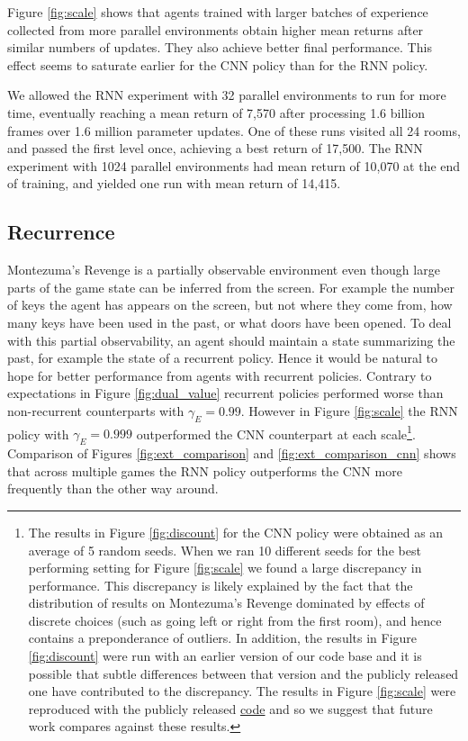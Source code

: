 \documentclass{article} \usepackage[dvipsnames]{xcolor}
\begin{document}
Figure \ref{fig:scale} shows that agents trained with larger batches of experience collected from more parallel environments obtain higher mean returns after similar numbers of updates.  They also achieve better final performance. This effect seems to saturate earlier for the CNN policy than for the RNN policy.

We allowed the RNN experiment with 32 parallel environments to run for more time, eventually reaching a mean return of 7,570 after processing 1.6 billion frames over 1.6 million parameter updates. One of these runs visited all 24 rooms, and passed the first level once, achieving a best return of 17,500. The RNN experiment with 1024 parallel environments had mean return of 10,070 at the end of training, and yielded one run with mean return of 14,415.

\subsection{Recurrence}
\label{sec:cnnrnn}
Montezuma's Revenge is a partially observable environment even though large parts of the game state can be inferred from the screen. For example the number of keys the agent has appears on the screen, but not where they come from, how many keys have been used in the past, or what doors have been opened. To deal with this partial observability, an agent should maintain a state summarizing the past, for example the state of a recurrent policy. Hence it would be natural to hope for better performance from agents with recurrent policies. Contrary to expectations in Figure \ref{fig:dual_value} recurrent policies performed worse than non-recurrent counterparts with $\gamma_E=0.99$. However in Figure \ref{fig:scale} the RNN policy with $\gamma_E=0.999$ outperformed the CNN counterpart at each scale\footnote{The results in Figure \ref{fig:discount} for the CNN policy were obtained as an average of 5 random seeds. When we ran 10 different seeds for the best performing setting for Figure \ref{fig:scale} we found a large discrepancy in performance. This discrepancy is likely explained by the fact that the distribution of results on Montezuma's Revenge dominated by effects of discrete choices (such as going left or right from the first room), and hence contains a preponderance of outliers. In addition, the results in Figure \ref{fig:discount} were run with an earlier version of our code base and it is possible that subtle differences between that version and the publicly released one have contributed to the discrepancy. The results in Figure \ref{fig:scale} were reproduced with the publicly released \href{https://github.com/openai/random-network-distillation}{code} and so we suggest that future work compares against these results.}. Comparison of Figures \ref{fig:ext_comparison} and \ref{fig:ext_comparison_cnn} shows that across multiple games the RNN policy outperforms the CNN more frequently than the other way around.
\end{document}
